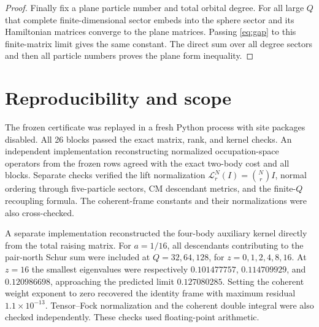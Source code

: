 \documentclass[11pt]{article}
\begin{document}
\begin{proof}
Finally fix a plane particle number and total orbital degree. For all large
$Q$ that complete finite-dimensional sector embeds into the sphere sector
and its Hamiltonian matrices converge to the plane matrices. Passing
\eqref{eq:gap} to this finite-matrix limit gives the same constant.
The direct sum over all degree sectors and then all particle numbers proves
the plane form inequality.
\end{proof}

\section{Reproducibility and scope}
The frozen certificate was replayed in a fresh Python process with site
packages disabled. All 26 blocks passed the exact matrix, rank, and kernel
checks.
An independent implementation reconstructing normalized occupation-space
operators from the frozen rows agreed with the exact two-body cost and all
blocks. Separate checks verified the lift normalization
$\mathcal L_r^N(I)=\binom NrI$, normal ordering through five-particle
sectors, CM descendant metrics, and the finite-$Q$ recoupling formula.
The coherent-frame constants and their normalizations were also
cross-checked.

A separate implementation reconstructed the four-body auxiliary kernel
directly from the total raising matrix. For $a=1/16$, all
descendants contributing to the pair-north Schur sum were included at
$Q=32,64,128$, for $z=0,1,2,4,8,16$. At $z=16$ the smallest eigenvalues
were respectively $0.101477757$, $0.114709929$, and $0.120986698$,
approaching the predicted limit $0.127080285$. Setting the coherent weight
exponent to zero recovered the identity frame with maximum residual
$1.1\times10^{-13}$. Tensor--Fock normalization and the coherent double
integral were also checked independently. These checks used
floating-point arithmetic.
\end{document}

